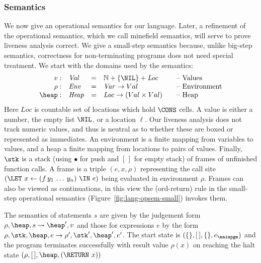 \subsubsection{Semantics}
We now give an operational
semantics for  our language.  Later, a refinement of
the  operational semantics,  which we  call minefield  semantics, will
serve to prove liveness analysis correct.
We give a small-step semantics because, unlike big-step semantics,
correctness for non-terminating programs does not need special treatment.
We start with the domains used by the semantics:
\[
\begin{array}{rlcl@{\hspace{2em}}l}
v:   & \mathit{Val} &=& \mathbb{N} + \{\NIL\} + \mathit{Loc}& \mbox{-- Values}\\
\rho: & \mathit{Env} &=&\mathit{Var} \rightarrow {Val} &
\mbox{-- Environment} \\ 
\heap: & \mathit{Heap} & =&\mathit{Loc} \rightarrow ({Val\times
  Val}) & \mbox{-- Heap}
\end{array}
\]
Here $\mathit{Loc}$ is countable set of locations which hold $\CONS$ cells.
A value is either a number, the empty list $\NIL$, or a location  $\ell$.
Our liveness analysis does not track numeric values, and thus is neutral
as to whether these are boxed or represented as immediates.
An environment is a finite mapping from variables to values, and a heap a finite mapping
from locations to pairs of values.
Finally, $\stk$ is a stack
(using $\bullet$ for push and $[\,]$ for empty stack)
of frames of unfinished function calls.  A
frame is a triple $(e,x,\rho)$ representing the call site
$
(\LET\,\, x \leftarrow (f\,y_1\,\ldots\,y_n) \,\, \IN\,\, e)
$
being evaluated in environment $\rho$.
Frames can also be viewed as continuations, in this view
the ({\sc ord-return}) 
 rule in the small-step operational semantics (Figure~\ref{fig:lang-opsem-small}) invokes them.

The semantics 
of statements $s$ are given by the judgement form
$\rho, \heap, s \rightsquigarrow \heap', v$
and those for expressions $e$ by the form
$\rho, \stk, \heap, e \rightarrow \rho', \stk', \heap', e'$.
The start state is $(\{\},[\,], \{\}, e_\mainpgm)$ and the
program terminates successfully with result value $\rho(x)$
on reaching the halt state $(\rho,[\,], \heap, (\RETURN\ x))$

